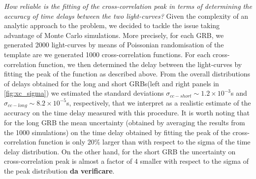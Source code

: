 \documentclass[]{spie}  %
\begin{document}
\emph{How reliable is the fitting of the cross-correlation peak in terms of determining the accuracy of time delays between the two light-curves?} Given the complexity of an analytic approach to the problem, we decided to tackle the issue taking advantage of Monte Carlo simulations. More precisely, for each GRB, we generated 2000 light-curves by means of Poissonian randomisation of the template are we generated 1000 cross-correlation functions. For each cross-correlation function, we then determined the delay between the light-curves by fitting the peak of the function as described above. From the overall distributions of delays obtained for the long and short GRBs(left and right panels in \ref{fig:xc_sigma}) we estimated the standard deviations $\sigma_{cc-short}\sim1.2\times10^{-3}$s and $\sigma_{cc-long}\sim 8.2\times10^{-5}$s, respectively, that we interpret as a realistic estimate of the accuracy on the time delay measured with this procedure. It is worth noting that for the long GRB the mean uncertainty (obtained by averaging the results from the 1000 simulations) on the time delay obtained by fitting the peak of the cross-correlation function is only 20\% larger than with respect to  the sigma of the time delay distribution. On the other hand, for the short GRB the uncertainty on cross-correlation peak is almost a factor of 4 smaller with respect to the sigma of the peak distribution \textbf{da verificare}.
\end{document}
